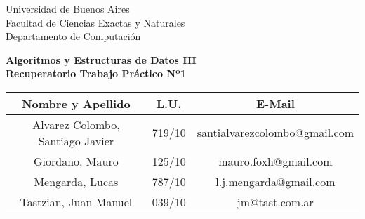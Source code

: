 \begin{titlepage}
\begin{center}
\vspace{4cm}

\textnormal{Universidad de Buenos Aires}\\
\textnormal{Facultad de Ciencias Exactas y Naturales}\\
\textnormal{Departamento de Computación}\\

\vspace{5cm}

\large\textbf{Algoritmos y Estructuras de Datos III} \\
\textbf{Recuperatorio Trabajo Práctico Nº1} \\

\vspace{7.5cm}

\begin{tabular}{|c |c |c |} \hline
	\textbf{Nombre y Apellido} & \textbf{L.U.} & \textbf{E-Mail} \\ \hline
	Alvarez Colombo, Santiago Javier & 719/10 & santialvarezcolombo@gmail.com \\ \hline
	Giordano, Mauro & 125/10 & mauro.foxh@gmail.com \\ \hline
	Mengarda, Lucas & 787/10 & l.j.mengarda@gmail.com \\ \hline
	Tastzian, Juan Manuel & 039/10 & jm@tast.com.ar \\ \hline
\end{tabular}

\vspace{4cm}

\vspace{2cm}


\end{center}
\end{titlepage}
